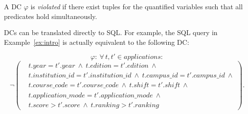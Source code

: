 A DC $\varphi$ is \emph{violated} if there exist tuples for the quantified variables such that all predicates hold simultaneously.

DCs can be translated directly to SQL.
For example, the SQL query in Example~\ref{ex:intro} is actually equivalent to the following DC:

\begingroup\small
\[
\varphi:\ \forall\, t, t' \in \mathit{applications}:
\]
\[ 
\neg\!\left(
\begin{aligned}
& t.\mathit{year}=t'.\mathit{year}\ \land\ t.\mathit{edition}=t'.\mathit{edition}\ \land \\
& t.\mathit{institution\_id}=t'.\mathit{institution\_id}\ \land\ t.\mathit{campus\_id}=t'.\mathit{campus\_id}\ \land \\
& t.\mathit{course\_code}=t'.\mathit{course\_code}\ \land\ t.\mathit{shift}=t'.\mathit{shift}\ \land \\
& t.\mathit{application\_mode}=t'.\mathit{application\_mode}\ \land \\
& t.\mathit{score}>t'.\mathit{score}\ \land\ t.\mathit{ranking}>t'.\mathit{ranking}
\end{aligned}
\right).
\]
\endgroup

